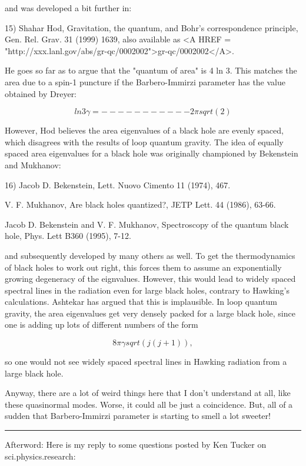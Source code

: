 and was developed a bit further in:

15) Shahar Hod, Gravitation, the quantum, and Bohr's correspondence
principle, Gen. Rel. Grav. 31 (1999) 1639, also available as <A HREF = "http://xxx.lanl.gov/abs/gr-qc/0002002">gr-qc/0002002</A>.

He goes so far as to argue that the "quantum of area" is 4 ln 3.
This matches the area due to a spin-1 puncture if the Barbero-Immirzi
parameter has the value obtained by Dreyer:


$$

            ln 3
\gamma  = -----------
        2 \pi  sqrt(2)
$$
    
However, Hod believes the area eigenvalues of a black hole are evenly
spaced, which disagrees with the results of loop quantum gravity.  The
idea of equally spaced area eigenvalues for a black hole was originally
championed by Bekenstein and Mukhanov:

16) Jacob D. Bekenstein, Lett. Nuovo Cimento 11 (1974), 467.

V. F. Mukhanov, Are black holes quantized?, JETP Lett. 44 (1986), 63-66.

Jacob D. Bekenstein and V. F. Mukhanov, Spectroscopy of the quantum
black hole, Phys. Lett B360 (1995), 7-12.

and subsequently developed by many others as well.  To get the
thermodynamics of black holes to work out right, this forces them to
assume an exponentially growing degeneracy of the eignvalues.  However,
this would lead to widely spaced spectral lines in the radiation even
for large black holes, contrary to Hawking's calculations.  Ashtekar has
argued that this is implausible.  In loop quantum gravity, the area
eigenvalues get very densely packed for a large black hole, since one is
adding up lots of different numbers of the form


$$

8 \pi  \gamma  sqrt(j(j+1)), 
$$
    
so one would not see widely spaced spectral lines in Hawking
radiation from a large black hole.  

Anyway, there are a lot of weird things here that I don't understand at
all, like these quasinormal modes.  Worse, it could all be just a
coincidence.  But, all of a sudden that Barbero-Immirzi parameter
is starting to smell a lot sweeter!

\par\noindent\rule{\textwidth}{0.4pt}


Afterword: Here is my reply to some questions posted by Ken Tucker on
sci.physics.research:

